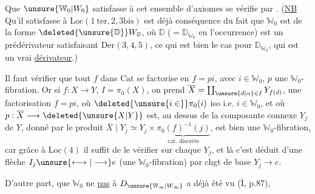 
Que $\unsure{\mathbb W_0|W_0}$ satisfasse à cet ensemble d'axiomes se vérifie  par . (\uline{NB} Qu'il satisfasse à $\mathrm{Loc}(1\ \mathrm{ter},2,3\mathrm{bis})$ est déjà conséquence du fait que $\mathbb W_0$ est de la forme $\deleted{\unsure{\mathbb D}}W_{\mathbb D}$, où $\mathbb D$ ($=\mathbb D_{\mathbb W_0}$ en l'occurrence) est un prédérivateur satisfaisant $\mathrm{Der}(3,4,5)$, ce qui est bien le cas pour $\mathbb D_{\mathbb W_0}$, qui est un vrai \uline{dérivateur}.)

Il faut vérifier que tout $f$ dans $\mathrm{Cat}$ se factorise en $f=pi$, avec $i\in\mathbb W_0$, $p$ une $\mathbb W_0$-fibration. Or si $f:X\longrightarrow Y$, $I=\pi_0(X)$, on prend $\overline X=\coprod_{\unsure{d|\alpha}\in I}Y_{f(d)}$,  une factorisation $f=pi$, où $\deleted{\unsure{i\in}}\pi_0(i)$ iso i.e. $i\in\mathbb W_0$, et où $p:\overline X\longrightarrow\deleted{\unsure{X|Y}}$ est, au dessus de la composante connexe $Y_j$ de $Y$, donné par le produit $\overline X\mid Y_j\simeq Y_j\times\underbrace{\pi_0(f)^{-1}(j)}_{\text{cat. discrète}}$,   est bien une $\mathbb W_0$-fibration, car grâce à $\mathrm{Loc}(4)$ il suffit de le vérifier sur chaque $Y_j$, et là c'est déduit d'une flèche $I_j\unsure{\longleftrightarrow|\longrightarrow}e$ (une $\mathbb W_0$-fibration) par chgt de base $Y_j\longrightarrow e$.

\unsure{/|,} D'autre part, que $\mathbb W_0$ ne  \uline{pas} à $D_{\unsure{\mathbb W_\infty|W_\infty}}$  a déjà été vu ($\overline{\mathrm I}$, p.87),
